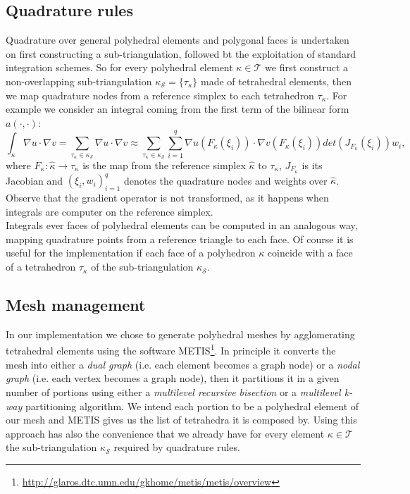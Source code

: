 \documentclass[12pt, a4paper]{article}
\theoremstyle{definition}
\theoremstyle{plain}
\theoremstyle{plain}
\begin{document}
\subsection{Quadrature rules}
Quadrature over general polyhedral elements and polygonal faces is undertaken on first constructing a sub-triangulation, followed bt the exploitation of standard integration schemes. So for every polyhedral element $\kappa \in \mathcal{T}$ we first construct a non-overlapping sub-triangulation $\kappa_\mathcal{S} = \{\tau_\kappa\}$ made of tetrahedral elements, then we map quadrature nodes from a reference simplex to each tetrahedron $\tau_\kappa$. For example we consider an integral coming from the first term of the bilinear form $a(\cdot, \cdot)$:
\begin{equation*}
	\int_\kappa \nabla u \cdot \nabla v = \sum_{\tau_\kappa \in \kappa_\mathcal{S}} \nabla u \cdot \nabla v \approx \sum_{\tau_\kappa \in \kappa_\mathcal{S}} \sum_{i=1}^{q} \nabla u(F_\kappa(\xi_i)) \cdot \nabla v(F_\kappa(\xi_i)) det(J_{F_\kappa}(\xi_i))w_i,
\end{equation*}
where $F_\kappa: \hat{\kappa} \rightarrow \tau_\kappa$ is the map from the reference
simplex $\hat{\kappa}$ to $\tau_\kappa$, $J_{F_\kappa}$ is its Jacobian	and $(\xi_i, w_i)^q_{i=1}$ denotes the quadrature nodes and weights over $\hat{\kappa}$. Observe that the gradient operator is not transformed, as it happens when integrals are computer on the reference simplex.\\
Integrals ever faces of polyhedral elements can be computed in an analogous way, mapping quadrature points from a reference triangle to each face. Of course it is useful for the implementation if each face of a polyhedron $\kappa$ coincide with a face of a tetrahedron $\tau_\kappa$ of the sub-triangulation $\kappa_\mathcal{S}$.
\subsection{Mesh management}
In our implementation we chose to generate polyhedral meshes by agglomerating tetrahedral elements using the software METIS\footnote{\url{http://glaros.dtc.umn.edu/gkhome/metis/metis/overview}}. In principle it converts the mesh into either a \textit{dual graph} (i.e. each element becomes a graph node) or a \textit{nodal graph} (i.e. each vertex becomes a graph node), then it partitions it in a given number of portions using either a \textit{multilevel recursive bisection} or a \textit{multilevel k-way} partitioning algorithm. We intend each portion to be a polyhedral element of our mesh and METIS gives us the list of tetrahedra it is composed by. Using this approach has also the convenience that we already have for every element $\kappa \in \mathcal{T}$ the sub-triangulation $\kappa_\mathcal{S}$ required by quadrature rules. 
\end{document}
